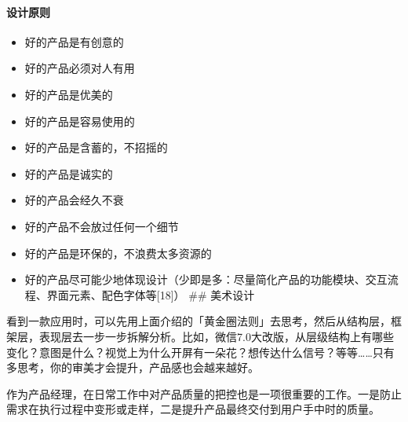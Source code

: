 \documentclass[letterpaper,10pt,english]{sphinxmanual}
\begin{document}
\paragraph{设计原则}
\label{\detokenize{chapter_idea/design:id15}}\begin{itemize}
\item {} 
好的产品是有创意的

\item {} 
好的产品必须对人有用

\item {} 
好的产品是优美的

\item {} 
好的产品是容易使用的

\item {} 
好的产品是含蓄的，不招摇的

\item {} 
好的产品是诚实的

\item {} 
好的产品会经久不衰

\item {} 
好的产品不会放过任何一个细节

\item {} 
好的产品是环保的，不浪费太多资源的

\item {} 
好的产品尽可能少地体现设计（少即是多：尽量简化产品的功能模块、交互流程、界面元素、配色字体等{[}18{]}）
\#\# 美术设计
%
\begin{footnote}[457]\sphinxAtStartFootnote
{}
%
\end{footnote}

\end{itemize}

看到一款应用时，可以先用上面介绍的「黄金圈法则」去思考，然后从结构层，框架层，表现层去一步一步拆解分析。比如，微信7.0大改版，从层级结构上有哪些变化？意图是什么？视觉上为什么开屏有一朵花？想传达什么信号？等等……只有多思考，你的审美才会提升，产品感也会越来越好。
%
\begin{footnote}[458]\sphinxAtStartFootnote
{}
%
\end{footnote}

作为产品经理，在日常工作中对产品质量的把控也是一项很重要的工作。一是防止需求在执行过程中变形或走样，二是提升产品最终交付到用户手中时的质量。
\end{document}
